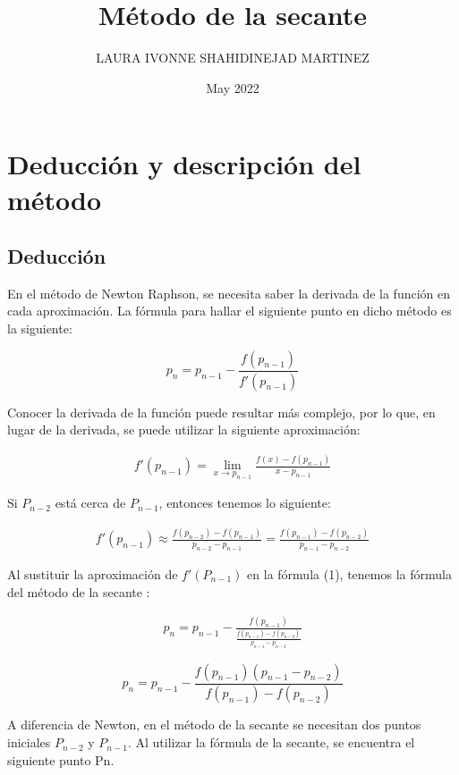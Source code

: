 \documentclass[10pt,technote]{IEEEtran}
\title{Método de la secante}
\author{LAURA IVONNE SHAHIDINEJAD MARTINEZ}
\date{May 2022}
\begin{document}
\maketitle

\section{Deducción y descripción del método}
\subsection{Deducción}
En el método de Newton Raphson, se necesita saber la derivada de la función en cada aproximación. La fórmula para hallar el siguiente punto en dicho método es la siguiente:

\begin{equation}
p_n = p_{n-1} - \frac{f(p_{n-1})}{f'(p_{n-1})}
\end{equation} 

Conocer la derivada de la función puede resultar más complejo, por lo que, en lugar de la derivada, se puede utilizar la siguiente aproximación:

\begin{gather*}
f'(p_{n-1}) = \lim_{x\to p_{n-1}} \frac{f(x) - f(p_{n-1})}{x-p_{n-1}} 
\end{gather*}

Si $P_{n-2}$ está cerca de $P_{n-1}$, entonces tenemos lo siguiente:

\begin{gather*}
f'(p_{n-1}) \approx \frac{f(p_{n-2})-f(p_{n-1})}{p_{n-2}-p_{n-1}} = \frac{f(p_{n-1})-f(p_{n-2})}{p_{n-1}-p_{n-2}}
\end{gather*}

Al sustituir la aproximación de $f'(P_{n-1})$ en la fórmula (1), tenemos la fórmula del método de la secante \cite{b2}:

\begin{gather*}
p_n = p_{n-1} - \frac{f(p_{n-1})}{\frac{f(p_{n-1})-f(p_{n-2})}{p_{n-1}-p_{n-2}}}
\end{gather*}

\begin{equation}
p_n = p_{n-1} - \frac{f(p_{n-1})(p_{n-1}-p_{n-2})}{f(p_{n-1})-f(p_{n-2})} 
\end{equation}


A diferencia de Newton, en el método de la secante se necesitan dos puntos iniciales $P_{n-2}$ y $P_{n-1}$. Al utilizar la fórmula de la secante, se encuentra el siguiente punto Pn. 
\end{document}

